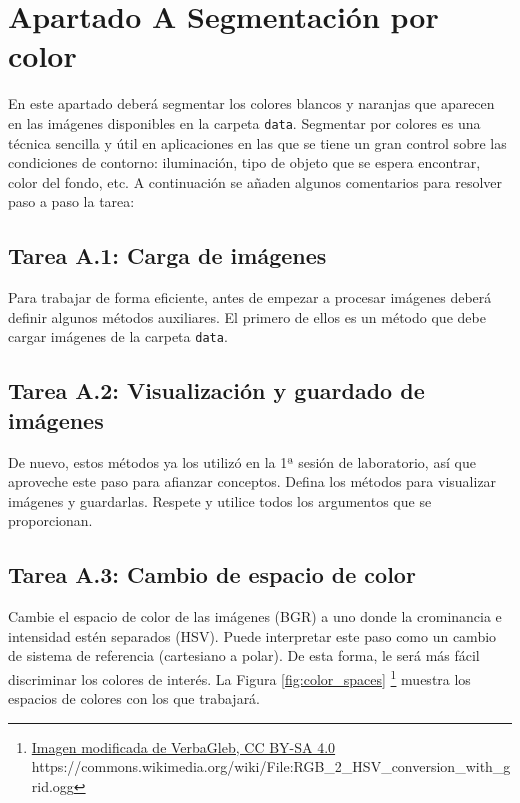 \chapter{Apartado A Segmentación por color}
\label{chapter:tarea_a}

En este apartado deberá segmentar los colores blancos y naranjas que aparecen en las imágenes disponibles en la carpeta \texttt{data}. Segmentar por colores es una técnica sencilla y útil en aplicaciones en las que se tiene un gran control sobre las condiciones de contorno: iluminación, tipo de objeto que se espera encontrar, color del fondo, etc. A continuación se añaden algunos comentarios para resolver paso a paso la tarea:

\section*{Tarea A.1: Carga de imágenes}
{}

Para trabajar de forma eficiente, antes de empezar a procesar imágenes deberá definir algunos métodos auxiliares. El primero de ellos es un método que debe cargar imágenes de la carpeta \texttt{data}.

\section*{Tarea A.2: Visualización y guardado de imágenes}

De nuevo, estos métodos ya los utilizó en la 1ª sesión de laboratorio, así que aproveche este paso para afianzar conceptos. Defina los métodos para visualizar imágenes y guardarlas. Respete y utilice todos los argumentos que se proporcionan.

\section*{Tarea A.3: Cambio de espacio de color}

Cambie el espacio de color de las imágenes (BGR) a uno donde la crominancia e intensidad estén separados (HSV). Puede interpretar este paso como un cambio de sistema de referencia (cartesiano a polar). De esta forma, le será más fácil discriminar los colores de interés. La Figura \ref{fig:color_spaces} \footnote{ \href{https://commons.wikimedia.org/wiki/File:RGB\_2\_HSV\_conversion\_with\_grid.ogg}{Imagen modificada de VerbaGleb, CC BY-SA 4.0} https://commons.wikimedia.org/wiki/File:RGB\_2\_HSV\_conversion\_with\_grid.ogg} muestra los espacios de colores con los que trabajará.

